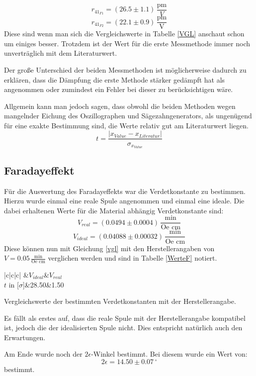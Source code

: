 $$r_{41_{F1}}=(26.5\pm1.1)\,\frac{\text{pm}}{V}$$
$$r_{41_{F2}}=(22.1\pm 0.9)\,\frac{\text{pm}}{\text{V}}$$
Diese sind wenn man sich die Vergleichswerte in Tabelle \ref{VGL} anschaut schon um einiges besser. Trotzdem ist der Wert für die erste Messmethode immer noch unverträglich mit dem Literaturwert.\par 
Der große Unterschied der beiden Messmethoden ist möglicherweise dadurch zu erklären, dass die Dämpfung die erste Methode stärker gedämpft hat als angenommen oder zumindest ein Fehler bei dieser zu berücksichtigen wäre.\par 
Allgemein kann man jedoch sagen, dass obwohl die beiden Methoden wegen mangelnder Eichung des Oszillographen und Sägezahngenerators, als ungenügend für eine exakte Bestimmung sind\cite{staatsex_farpock}, die Werte relativ gut am Literaturwert liegen.
\begin{equation}
	t=\frac{|x_{Value}-x_{Literatur}|}{\sigma_{x_{Value}}}
	\label{vgl}
\end{equation}
\subsection{Faradayeffekt}
Für die Auswertung des Faradayeffekts war die Verdetkonstante zu bestimmen. Hierzu wurde einmal eine reale Spule angenommen und einmal eine ideale. Die dabei erhaltenen Werte für die Material abhängig Verdetkonstante sind:
$$V_{real}=(0.0494 \pm 0.0004)\,\frac{\text{min}}{\text{Oe cm}}$$
$$V_{ideal}=(0.04088 \pm 0.00032)\,\frac{\text{min}}{\text{Oe cm}}$$
Diese können nun mit Gleichung \ref{vgl} mit den Herstellerangaben von $V=0.05\,\frac{\text{min}}{\text{Oe cm}}$ verglichen werden und sind in Tabelle \ref{WerteF} notiert.
\begin{table}[ht]
	\begin{Dtabular}[1.1]{|c|c|c|}
		\hline
		&$V_{ideal}$&$V_{real}$\\
		\hline
		$t$ in [$\sigma$]&28.50&1.50\\
		\hline
	\end{Dtabular}
	\centering
	\caption{Vergleichswerte der bestimmten Verdetkonstanten mit der Herstellerangabe.}
	\label{WerteF}
\end{table}
Es fällt als erstes auf, dass die reale Spule mit der Herstellerangabe kompatibel ist, jedoch die der idealisierten Spule nicht. Dies entspricht natürlich auch den Erwartungen.\par
Am Ende wurde noch der $2\epsilon$-Winkel bestimmt. Bei diesem wurde ein Wert von:
$$2\epsilon=14.50\pm0.07\,^\circ$$
bestimmt.